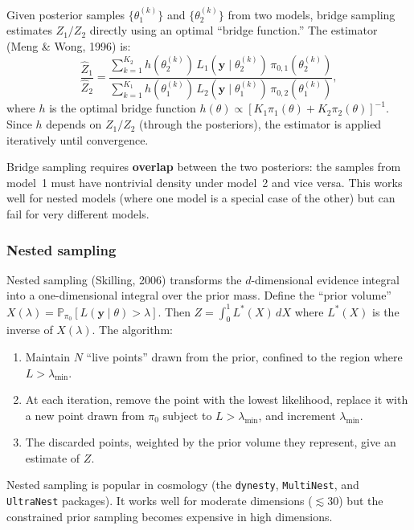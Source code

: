 \documentclass[11pt]{article}
\newcommand{\Prb}{\mathbb{P}}
\theoremstyle{plain}
\theoremstyle{remark}
\theoremstyle{definition}
\begin{document}
Given posterior samples $\{\theta_1^{(k)}\}$ and $\{\theta_2^{(k)}\}$ from 
two models, bridge sampling estimates $Z_1/Z_2$ directly using an optimal 
``bridge function.'' The estimator (Meng \& Wong, 1996) is:
\begin{equation}\label{eq:bridge}
\frac{\hat{Z}_1}{\hat{Z}_2} 
= \frac{\sum_{k=1}^{K_2} h(\theta_2^{(k)})\,
  L_1(\mathbf{y} \mid \theta_2^{(k)})\,\pi_{0,1}(\theta_2^{(k)})}
{\sum_{k=1}^{K_1} h(\theta_1^{(k)})\,
  L_2(\mathbf{y} \mid \theta_1^{(k)})\,\pi_{0,2}(\theta_1^{(k)})},
\end{equation}
where $h$ is the optimal bridge function 
$h(\theta) \propto [K_1 \pi_1(\theta) + K_2 \pi_2(\theta)]^{-1}$. Since $h$ 
depends on $Z_1/Z_2$ (through the posteriors), the estimator is applied 
iteratively until convergence.

Bridge sampling requires \textbf{overlap} between the two posteriors: the 
samples from model~1 must have nontrivial density under model~2 and vice 
versa. This works well for nested models (where one model is a special case 
of the other) but can fail for very different models.

\subsubsection{Nested sampling}

Nested sampling (Skilling, 2006) transforms the $d$-dimensional evidence 
integral into a one-dimensional integral over the prior mass. Define the 
``prior volume'' $X(\lambda) = \Prb_{\pi_0}[L(\mathbf{y} \mid \theta) > \lambda]$. 
Then $Z = \int_0^1 L^*(X)\,dX$ where $L^*(X)$ is the inverse of $X(\lambda)$. 
The algorithm:
\begin{enumerate}[label=(\alph*)]
\item Maintain $N$ ``live points'' drawn from the prior, confined to the 
  region where $L > \lambda_{\min}$.
\item At each iteration, remove the point with the lowest likelihood, 
  replace it with a new point drawn from $\pi_0$ subject to 
  $L > \lambda_{\min}$, and increment $\lambda_{\min}$.
\item The discarded points, weighted by the prior volume they represent, 
  give an estimate of $Z$.
\end{enumerate}
Nested sampling is popular in cosmology (the \texttt{dynesty}, 
\texttt{MultiNest}, and \texttt{UltraNest} packages). It works well for 
moderate dimensions ($\lesssim 30$) but the constrained prior sampling 
becomes expensive in high dimensions.
\end{document}
